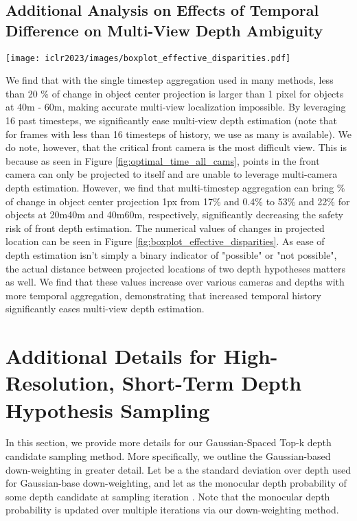 \documentclass[runningheads, hyperfootnotes=false]{article}
\begin{document}
\subsection{Additional Analysis on Effects of Temporal Difference on Multi-View Depth Ambiguity}\label{app:theory_ambig}
\begin{figure*}[t]
  \centering
  \texttt{[image: iclr2023/images/boxplot\_effective\_disparities.pdf]}
  \captionsetup{aboveskip=0pt}\captionsetup{belowskip=0pt}\caption{Visualization of absolute value of change in projected location for object centers induced by a 0.5m change in depth.}
  \label{fig:boxplot_effective_disparities}
\end{figure*} We find that with the single timestep aggregation used in many methods, less than 20 \% of change in object center projection is larger than 1 pixel for objects at 40m - 60m, making accurate multi-view localization impossible. By leveraging 16 past timesteps, we significantly ease multi-view depth estimation (note that for frames with less than 16 timesteps of history, we use as many is available). We do note, however, that the critical front camera is the most difficult view. This is because as seen in Figure \ref{fig:optimal_time_all_cams}, points in the front camera can only be projected to itself and are unable to leverage multi-camera depth estimation. However, we find that multi-timestep aggregation can bring \% of change in object center projection  1px from 17\% and 0.4\% to 53\% and 22\% for objects at 20m\-40m and 40m\-60m, respectively, significantly decreasing the safety risk of front depth estimation. The numerical values of changes in projected location can be seen in Figure \ref{fig:boxplot_effective_disparities}. As ease of depth estimation isn't simply a binary indicator of "possible" or "not possible", the actual distance between projected locations of two depth hypotheses matters as well. We find that these values increase over various cameras and depths with more temporal aggregation, demonstrating that increased temporal history significantly eases multi-view depth estimation. \section{Additional Details for High-Resolution, Short-Term Depth Hypothesis Sampling}\label{app:sampling}
In this section, we provide more details for our Gaussian-Spaced Top-k depth candidate sampling method. More specifically, we outline the Gaussian-based down-weighting in greater detail. Let  be a the standard deviation over depth used for Gaussian-base down-weighting, and let  as the monocular depth probability of some depth candidate  at sampling iteration . Note that the monocular depth probability is updated over multiple iterations via our down-weighting method. 
\end{document}
